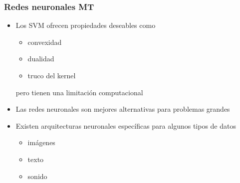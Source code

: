 \documentclass[aspectratio=43,spanish]{beamer}
\begin{document}
\begin{frame}
      \frametitle{Redes neuronales MT}

      \begin{itemize}
            \item Los SVM ofrecen propiedades deseables como
            \begin{itemize}
                  \item convexidad
                  \item dualidad
                  \item truco del kernel
            \end{itemize}
            pero tienen una limitación computacional
            \item Las redes neuronales son mejores alternativas para problemas grandes
            \item Existen arquitecturas neuronales específicas para algunos tipos de datos
            \begin{itemize}
                  \item imágenes
                  \item texto
                  \item sonido
            \end{itemize}
      \end{itemize}

\end{frame}
\end{document}
